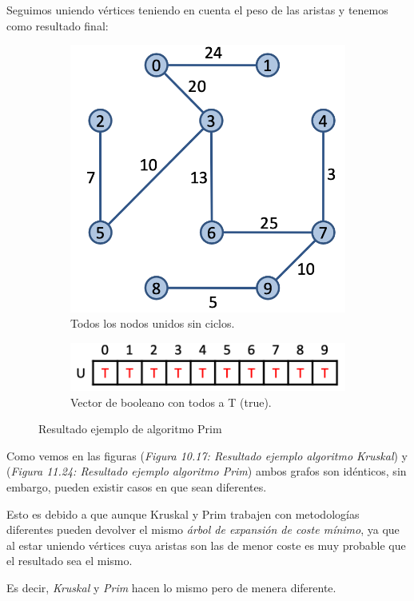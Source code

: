 Seguimos uniendo vértices teniendo en cuenta el peso de las aristas y tenemos como resultado final:
\begin{figure}[h]
  \begin{minipage}{0.4\textwidth}
    \centering
    \begin{subfigure}{\textwidth}
      \centering
      \includegraphics[width=.5\textwidth]{assets/prim15.png}
      \caption{Todos los nodos unidos sin ciclos.}
    \end{subfigure}
  \end{minipage}
  \hfill
  \begin{minipage}{0.5\textwidth}
    \centering
    \begin{subfigure}{\textwidth}
      \centering
      \includegraphics[width=.8\textwidth]{assets/prim16.png}
      \caption{Vector de booleano con todos a T (true).}
    \end{subfigure}
  \end{minipage}
  \caption{Resultado ejemplo de algoritmo Prim}
\end{figure}

Como vemos en las figuras (\textit{Figura 10.17: Resultado ejemplo algoritmo Kruskal}) y (\textit{Figura 11.24: Resultado ejemplo algoritmo Prim}) ambos grafos son idénticos, sin embargo, pueden existir casos en que sean diferentes.

Esto es debido a que aunque Kruskal y Prim trabajen con metodologías diferentes pueden devolver el mismo \textit{árbol de expansión de coste mínimo}, ya que al estar uniendo vértices cuya aristas son las de menor coste es muy probable que el resultado sea el mismo.

Es decir, \textit{Kruskal} y \textit{Prim} hacen lo mismo pero de menera diferente.